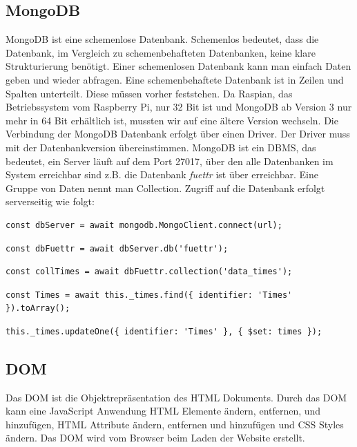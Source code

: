 \subsection{MongoDB}
\label{sec:vor-mongo}
MongoDB ist eine schemenlose Datenbank. Schemenlos bedeutet, dass die Datenbank, im Vergleich zu schemenbehafteten Datenbanken, keine klare Strukturierung benötigt. Einer schemenlosen Datenbank kann man einfach Daten geben und wieder abfragen. Eine schemenbehaftete Datenbank ist in Zeilen und Spalten unterteilt. Diese müssen vorher feststehen. Da Raspian, das Betriebssystem vom Raspberry Pi, nur 32 Bit ist und MongoDB ab Version 3 nur mehr in 64 Bit erhältlich ist, mussten wir auf eine ältere Version wechseln. Die Verbindung der MongoDB Datenbank erfolgt über einen Driver. Der Driver muss mit der Datenbankversion übereinstimmen. MongoDB ist ein \ac{DBMS}, das bedeutet, ein Server läuft auf dem Port 27017, über den alle Datenbanken im System erreichbar sind z.B. die Datenbank \textit{fuettr} ist über  erreichbar. Eine Gruppe von Daten nennt man Collection. Zugriff auf die Datenbank erfolgt serverseitig wie folgt:

\begin{lstlisting}[caption=Verbinden mit dem \ac{DBMS},style=TS]
const dbServer = await mongodb.MongoClient.connect(url);
\end{lstlisting}

\begin{lstlisting}[caption=Auswählen der Datenbank,style=TS]
const dbFuettr = await dbServer.db('fuettr');
\end{lstlisting}

\begin{lstlisting}[caption=Auswählen der Collection,style=TS]
const collTimes = await dbFuettr.collection('data_times');
\end{lstlisting}

\begin{lstlisting}[caption=Auslesen aller Datensätze mit einem Identifier,style=TS]
const Times = await this._times.find({ identifier: 'Times' }).toArray();
\end{lstlisting}

\begin{lstlisting}[caption=Überschreiben eines Datensatzes mit einem Identifier,style=TS]
this._times.updateOne({ identifier: 'Times' }, { $set: times });
\end{lstlisting}

\subsection{DOM}
\label{sec:vor-dom}
Das \ac{DOM} ist die Objektrepräsentation des \ac{HTML} Dokuments. Durch das \ac{DOM} kann eine JavaScript Anwendung \ac{HTML} Elemente ändern, entfernen, und hinzufügen, \ac{HTML} Attribute ändern, entfernen und hinzufügen und \ac{CSS} Styles ändern. Das \ac{DOM} wird vom Browser beim Laden der Website erstellt. 

